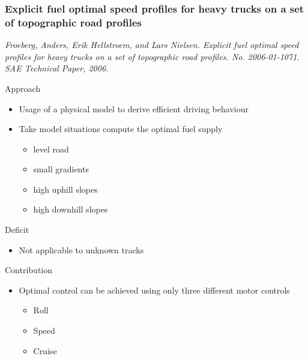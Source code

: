 \documentclass[8pt]{beamer}
\begin{document}
\begin{frame}
	\frametitle{Explicit fuel optimal speed profiles for heavy trucks on a set of topographic road profiles}
	\textit{Froeberg, Anders, Erik Hellstroem, and Lars Nielsen. Explicit fuel optimal speed profiles for heavy trucks on a set of topographic road profiles. No. 2006-01-1071. SAE Technical Paper, 2006.}\vspace{5mm}
	
	Approach
	\begin{itemize}
		\item Usage of a physical model to derive efficient driving behaviour
		\item Take model situations compute the optimal fuel supply
		\begin{itemize}
			\item level road
			\item small gradients
			\item high uphill slopes
			\item high downhill slopes
		\end{itemize}
	\end{itemize}
	
	Deficit
	\begin{itemize}
		\item Not applicable to unknown tracks
	\end{itemize}
	
	Contribution
	\begin{itemize}
		\item Optimal control can be achieved using only three different motor controls
		\begin{itemize}
			\item Roll
			\item Speed
			\item Cruise
		\end{itemize}
	\end{itemize}
\end{frame}
\end{document}
